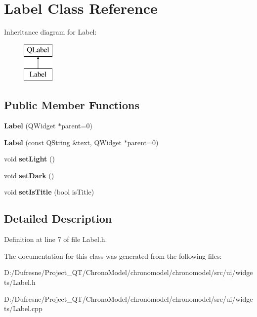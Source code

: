 \hypertarget{class_label}{\section{Label Class Reference}
\label{class_label}
}
Inheritance diagram for Label\-:\begin{figure}[H]
\begin{center}
\leavevmode
\includegraphics[height=2.000000cm]{class_label}
\end{center}
\end{figure}
\subsection*{Public Member Functions}
\begin{DoxyCompactItemize}
\item 
\hypertarget{class_label_a8f43a231b00daa09d72a7263dca2b107}{{\bfseries Label} (Q\-Widget $\ast$parent=0)}\label{class_label_a8f43a231b00daa09d72a7263dca2b107}

\item 
\hypertarget{class_label_a24fbd6634f58ecd6c2f6db26dea484db}{{\bfseries Label} (const Q\-String \&text, Q\-Widget $\ast$parent=0)}\label{class_label_a24fbd6634f58ecd6c2f6db26dea484db}

\item 
\hypertarget{class_label_aa6ad5d03f46438ebcb76da49689fcc64}{void {\bfseries set\-Light} ()}\label{class_label_aa6ad5d03f46438ebcb76da49689fcc64}

\item 
\hypertarget{class_label_a84ae7b1113847b0cc7a7ec8b43ea53c8}{void {\bfseries set\-Dark} ()}\label{class_label_a84ae7b1113847b0cc7a7ec8b43ea53c8}

\item 
\hypertarget{class_label_a12f2293f15e8346bde37554149e0b9de}{void {\bfseries set\-Is\-Title} (bool is\-Title)}\label{class_label_a12f2293f15e8346bde37554149e0b9de}

\end{DoxyCompactItemize}


\subsection{Detailed Description}


Definition at line 7 of file Label.\-h.



The documentation for this class was generated from the following files\-:\begin{DoxyCompactItemize}
\item 
D\-:/\-Dufresne/\-Project\-\_\-\-Q\-T/\-Chrono\-Model/chronomodel/chronomodel/src/ui/widgets/Label.\-h\item 
D\-:/\-Dufresne/\-Project\-\_\-\-Q\-T/\-Chrono\-Model/chronomodel/chronomodel/src/ui/widgets/Label.\-cpp\end{DoxyCompactItemize}
